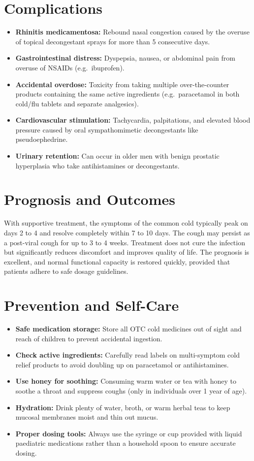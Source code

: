 \section*{Complications}
\begin{itemize}
    \item \textbf{Rhinitis medicamentosa:} Rebound nasal congestion caused by the overuse of topical decongestant sprays for more than 5 consecutive days.
    \item \textbf{Gastrointestinal distress:} Dyspepsia, nausea, or abdominal pain from overuse of NSAIDs (e.g.\ ibuprofen).
    \item \textbf{Accidental overdose:} Toxicity from taking multiple over-the-counter products containing the same active ingredients (e.g.\ paracetamol in both cold/flu tablets and separate analgesics).
    \item \textbf{Cardiovascular stimulation:} Tachycardia, palpitations, and elevated blood pressure caused by oral sympathomimetic decongestants like pseudoephedrine.
    \item \textbf{Urinary retention:} Can occur in older men with benign prostatic hyperplasia who take antihistamines or decongestants.
\end{itemize}

\section*{Prognosis and Outcomes}
With supportive treatment, the symptoms of the common cold typically peak on days 2 to 4 and resolve completely within 7 to 10 days. The cough may persist as a post-viral cough for up to 3 to 4 weeks. Treatment does not cure the infection but significantly reduces discomfort and improves quality of life. The prognosis is excellent, and normal functional capacity is restored quickly, provided that patients adhere to safe dosage guidelines.

\section*{Prevention and Self-Care}
\begin{itemize}
    \item \textbf{Safe medication storage:} Store all OTC cold medicines out of sight and reach of children to prevent accidental ingestion.
    \item \textbf{Check active ingredients:} Carefully read labels on multi-symptom cold relief products to avoid doubling up on paracetamol or antihistamines.
    \item \textbf{Use honey for soothing:} Consuming warm water or tea with honey to soothe a throat and suppress coughs (only in individuals over 1 year of age).
    \item \textbf{Hydration:} Drink plenty of water, broth, or warm herbal teas to keep mucosal membranes moist and thin out mucus.
    \item \textbf{Proper dosing tools:} Always use the syringe or cup provided with liquid paediatric medications rather than a household spoon to ensure accurate dosing.
\end{itemize}

